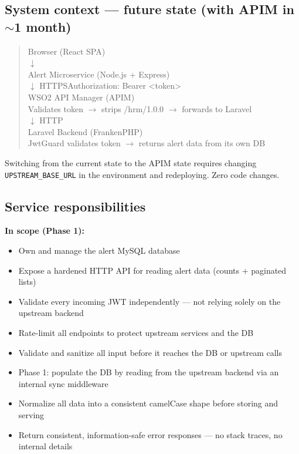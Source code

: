 \documentclass[11pt]{article}
\begin{document}
\subsection{System context --- future state (with APIM in $\sim$1 month)}

\begin{quote}
\small\ttfamily
Browser (React SPA) \\[4pt]
$\downarrow$ \\[4pt]
Alert Microservice (Node.js + Express) \\[4pt]
$\downarrow$ HTTPS\quad Authorization: Bearer \textless token\textgreater \\[4pt]
WSO2 API Manager (APIM) \\
\hspace*{1em}Validates token $\rightarrow$ strips /hrm/1.0.0 $\rightarrow$ forwards to Laravel \\[4pt]
$\downarrow$ HTTP \\[4pt]
Laravel Backend (FrankenPHP) \\
\hspace*{1em}JwtGuard validates token $\rightarrow$ returns alert data from its own DB
\end{quote}

\begin{notebox}[Transition]
Switching from the current state to the APIM state requires changing \texttt{UPSTREAM\_BASE\_URL}
in the environment and redeploying. Zero code changes.
\end{notebox}

\subsection{Service responsibilities}

\textbf{In scope (Phase 1):}
\begin{itemize}
  \item Own and manage the alert MySQL database
  \item Expose a hardened HTTP API for reading alert data (counts + paginated lists)
  \item Validate every incoming JWT independently --- not relying solely on the upstream backend
  \item Rate-limit all endpoints to protect upstream services and the DB
  \item Validate and sanitize all input before it reaches the DB or upstream calls
  \item Phase 1: populate the DB by reading from the upstream backend via an internal sync middleware
  \item Normalize all data into a consistent camelCase shape before storing and serving
  \item Return consistent, information-safe error responses --- no stack traces, no internal details
\end{itemize}
\end{document}
